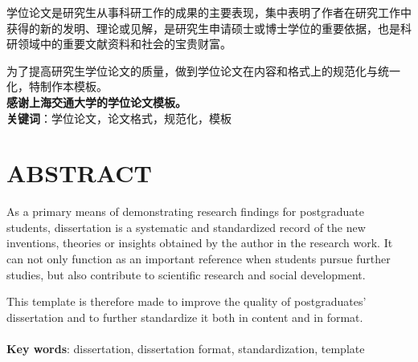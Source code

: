 \documentclass[UTF8,a4paper,12pt]{ctexart}
\numberwithin{equation}{section}
\begin{document}
\hspace{8mm}学位论文是研究生从事科研工作的成果的主要表现，集中表明了作者在研究工作中获得的新的发明、理论或见解，是研究生申请硕士或博士学位的重要依据，也是科研领域中的重要文献资料和社会的宝贵财富。\par
为了提高研究生学位论文的质量，做到学位论文在内容和格式上的规范化与统一化，特制作本模板。\\

\textbf{感谢上海交通大学的学位论文模板。}
~\\
\textbf{关键词}：学位论文，论文格式，规范化，模板\\

\newpage
\section*{ABSTRACT}

\hspace{8mm}As a primary means of demonstrating research findings for postgraduate students, dissertation is a systematic and standardized record of the new inventions, theories or insights obtained by the author in the research work. It can not only function as an important reference when students pursue further studies, but also contribute to scientific research and social development.\par
This template is therefore made to improve the quality of postgraduates’ dissertation and to further standardize it both in content and in format.\\
~\\
\textbf{Key words}: dissertation, dissertation format, standardization, template

\newpage
\renewcommand\contentsname{\textbf{目\quad 录}}
\begin{center}
{\tableofcontents %
}
\end{center}
\end{document}

